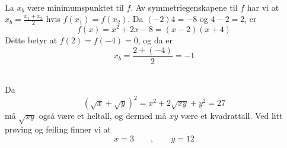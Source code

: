 





\\
La $ x_b $ være minimumspunktet til $ f $. Av symmetriegenskapene til $ f $ har vi at $ x_b=\frac{x_1+x_2}{2} $ hvis $ f(x_1)=f(x_2) $. Da $ {(-2)4=-8} $ og $ {4-2=2} $, er
\[ f(x)=x^2+2x-8=(x-2)(x+4) \]
Dette betyr at $ f(2)=f(-4)=0 $, og da er
\[ x_b=\frac{2+(-4)}{2}=-1 \]

\newpage
{}\\
Da
\[ (\sqrt{x}+\sqrt{y})^2 = x^2+2\sqrt{xy}+y^2=27  \]
må $ \sqrt{xy} $ også være et heltall, og dermed må $ xy $ være et kvadrattall. %
Ved litt prøving og feiling finner vi at 
\[ x=3 \qquad, \qquad y = 12\]


